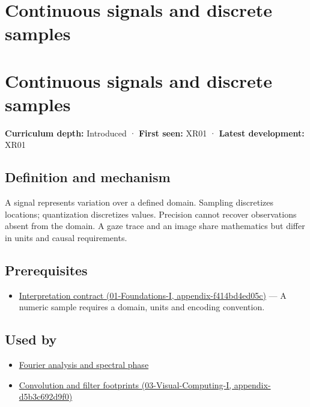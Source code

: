 \hypertarget{appendix-1077ea8fc737}{}
\section*{Continuous signals and discrete samples}
\section{Continuous signals and discrete samples}\label{appendix-1077ea8fc737-continuous-signals-and-discrete-samples}

\textbf{Curriculum depth:} Introduced · \textbf{First seen:} XR01 · \textbf{Latest development:} XR01

\subsection{Definition and mechanism}\label{appendix-1077ea8fc737-definition-and-mechanism}

A signal represents variation over a defined domain. Sampling discretizes locations; quantization discretizes values. Precision cannot recover observations absent from the domain. A gaze trace and an image share mathematics but differ in units and causal requirements.

\subsection{Prerequisites}\label{appendix-1077ea8fc737-prerequisites}

\begin{itemize}
\tightlist
\item
  \href{../01-Foundations-I/main.pdf\#nameddest=appendix-f414bd4ed05c}{Interpretation contract (01-Foundations-I, appendix-f414bd4ed05c)} --- A numeric sample requires a domain, units and encoding convention.
\end{itemize}

\subsection{Used by}\label{appendix-1077ea8fc737-used-by}

\begin{itemize}
\tightlist
\item
  \hyperref[appendix-b60686ba06a1]{Fourier analysis and spectral phase}
\item
  \href{../03-Visual-Computing-I/main.pdf\#nameddest=appendix-d5b3c692d9f0}{Convolution and filter footprints (03-Visual-Computing-I, appendix-d5b3c692d9f0)}
\end{itemize}

